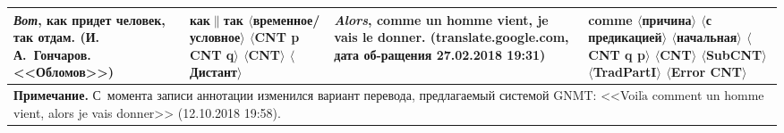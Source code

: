 \begin{table*}\small %
\begin{center}
\vspace*{2ex}


\tabcolsep=7.5pt
\begin{tabular}{|p{44mm}|p{32mm}|p{45mm}|p{24mm}|}
\hline
\textit{Вот}, \textbf{как} придет человек, \textbf{так} отдам.\newline
\newline
\newline
\newline
\newline
\newline
\newline
(И.\,А.~Гончаров. <<Обломов>>)&\textbf{как}$\|$\textbf{так}\newline
$\langle$временное/условное$\rangle$\newline
$\langle$CNT p CNT q$\rangle$\newline
$\langle$CNT$\rangle$\newline 
$\langle$Дистант$\rangle$
&\textit{Alors}, \textbf{comme} un homme vient, je vais le donner.\newline
\newline
\newline
\newline
\newline
\newline
(translate.google.com, дата об-\linebreak ра\-ще\-ния 27.02.2018 19:31)&\textbf{comme}\newline 
$\langle$причина$\rangle$\newline
$\langle$с предикацией$\rangle$\newline
$\langle$начальная$\rangle$\newline
$\langle$CNT q p$\rangle$\newline
$\langle$CNT$\rangle$\newline
$\langle$SubCNT$\rangle$\newline
$\langle$TradPartI$\rangle$\newline
$\langle$Error CNT$\rangle$\\
\hline
\multicolumn{4}{p{159mm}}{\footnotesize \hspace*{2mm}\textbf{Примечание.} С~момента записи 
аннотации изменился вариант перевода, предлагаемый системой GNMT: <<Voil$\grave{\mbox{a}}$ comment un homme 
vient, alors je vais donner>> (12.10.2018 19:58).}
\end{tabular}
\end{center}
\begin{center}
\vspace*{2ex}


\end{center}
\end{table*}
